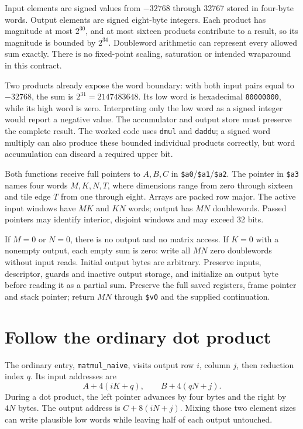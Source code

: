 Input elements are signed values from $-32768$ through 32767 stored in four-byte
words. Output elements are signed eight-byte integers. Each product has magnitude
at most $2^{30}$, and at most sixteen products contribute to a result, so its
magnitude is bounded by $2^{34}$. Doubleword arithmetic can represent every
allowed sum exactly. There is no fixed-point scaling, saturation or intended
wraparound in this contract.

Two products already expose the word boundary: with both input pairs equal to
$-32768$, the sum is $2^{31}=2147483648$. Its low word is hexadecimal
\texttt{80000000}, while its high word is zero. Interpreting only the low word as
a signed integer would report a negative value. The accumulator and output store
must preserve the complete result. The worked code uses \texttt{dmul} and
\texttt{daddu}; a signed word multiply can also produce these bounded individual
products correctly, but word accumulation can discard a required upper bit.

Both functions receive full pointers to $A,B,C$ in
\texttt{\$a0}/\texttt{\$a1}/\texttt{\$a2}. The pointer in \texttt{\$a3} names
four words $M,K,N,T$, where dimensions range from zero through sixteen and tile
edge $T$ from one through eight. Arrays are packed row major. The active input
windows have $MK$ and $KN$ words; output has $MN$ doublewords. Passed pointers
may identify interior, disjoint windows and may exceed 32 bits.

If $M=0$ or $N=0$, there is no output and no matrix access. If $K=0$ with a
nonempty output, each empty sum is zero: write all $MN$ zero doublewords without
input reads. Initial output bytes are arbitrary. Preserve inputs, descriptor,
guards and inactive output storage, and initialize an output byte before reading
it as a partial sum. Preserve the full saved registers, frame pointer and stack
pointer; return $MN$ through \texttt{\$v0} and the supplied continuation.

\section{Follow the ordinary dot product}

The ordinary entry, \texttt{matmul\_naive}, visits output row $i$, column $j$,
then reduction index $q$. Its input addresses are
\[
  A+4(iK+q),\qquad B+4(qN+j).
\]
During a dot product, the left pointer advances by four bytes and the right by
$4N$ bytes. The output address is $C+8(iN+j)$. Mixing those two element sizes can
write plausible low words while leaving half of each output untouched.

